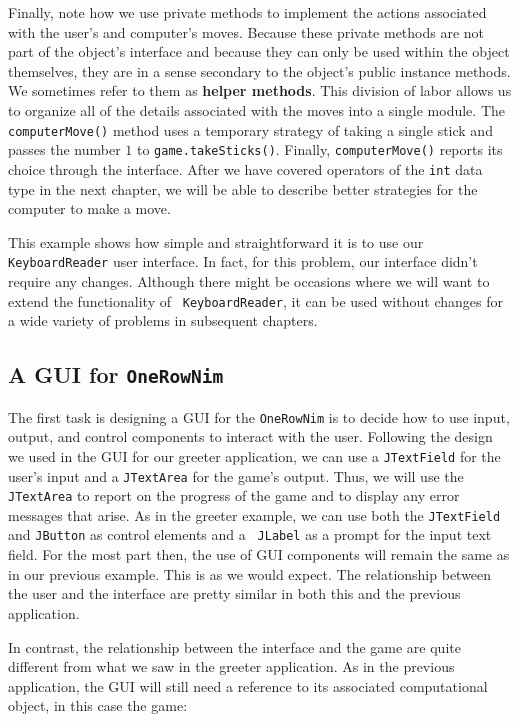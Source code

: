 Finally, note how we use private methods to implement the actions
associated with the user's and computer's moves. Because these private
methods are not part of the object's interface and because they can
only be used within the object themselves, they are in a sense
secondary to the object's public instance methods. We sometimes refer
to them as {\bf helper methods}.  This division of labor allows us to
organize all of the details associated with the moves into a single
module. The {\tt computerMove()} method uses a temporary strategy
of taking a single stick and passes the
number $1$ to {\tt game.takeSticks()}.  Finally, {\tt computerMove()}
reports its choice through the interface.  After we have covered
operators of the {\tt int} data type in the next chapter, we will be able
to describe better strategies for the computer to make a move.

This example shows how simple and straightforward it is to use our
{\tt KeyboardReader} user interface. In fact, for this problem, our
interface didn't require any changes. Although there might be occasions
where we will want to extend the functionality of {\tt
KeyboardReader}, it can be used without changes for a wide variety of
problems in subsequent chapters.



\subsection{A GUI for {\tt OneRowNim}}

The first task is designing a GUI for the {\tt OneRowNim} is to
decide how to use input, output, and control components to interact
with the user. Following the design we used in the GUI for our greeter
application, we can use a {\tt JTextField} for the user's input and a
{\tt JTextArea} for the game's output. Thus, we will use the {\tt
JTextArea} to report on the progress of the game and to display any
error messages that arise.  As in the greeter example, we can use both
the {\tt JTextField} and {\tt JButton} as control elements and a {\tt
JLabel} as a prompt for the input text field.  For the most part then,
the use of GUI components will remain the same as in our previous
example. This is as we would expect. The relationship between the user
and the interface are pretty similar in both this and the previous
application.

In contrast, the relationship between the interface and the game are
quite different from what we saw in the greeter application.  As in
the previous application, the GUI will still need a reference to its
associated computational object, in this case the game:

